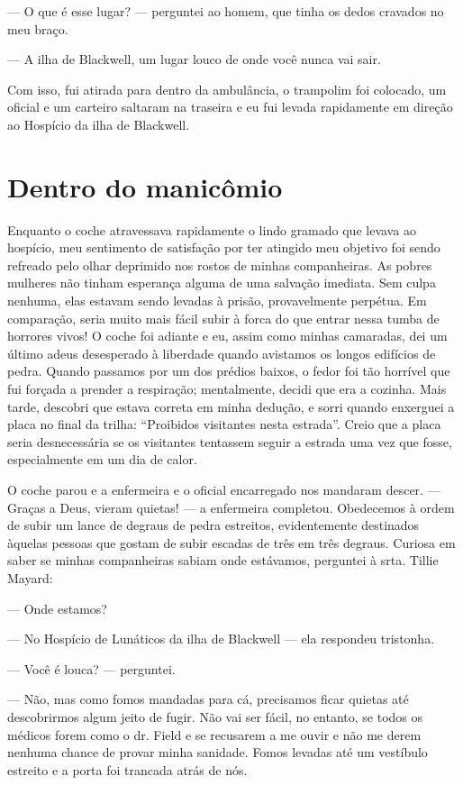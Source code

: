 --- O que é esse lugar? --- perguntei ao homem, que tinha os dedos
cravados no meu braço.

--- A ilha de Blackwell, um lugar louco de onde você nunca vai sair.

Com isso, fui atirada para dentro da ambulância, o trampolim foi
colocado, um oficial e um carteiro saltaram na traseira e eu fui levada
rapidamente em direção ao Hospício da ilha de Blackwell.

\chapter{Dentro do
manicômio}\label{capuxedtulo-viii-dentro-do-manicuxf4mio}

Enquanto o coche atravessava rapidamente o lindo gramado que levava ao
hospício, meu sentimento de satisfação por ter atingido meu objetivo foi
sendo refreado pelo olhar deprimido nos rostos de minhas companheiras.
As pobres mulheres não tinham esperança alguma de uma salvação imediata.
Sem culpa nenhuma, elas estavam sendo levadas à prisão, provavelmente
perpétua. Em comparação, seria muito mais fácil subir à forca do que
entrar nessa tumba de horrores vivos! O coche foi adiante e eu, assim
como minhas camaradas, dei um último adeus desesperado à liberdade
quando avistamos os longos edifícios de pedra. Quando passamos por um
dos prédios baixos, o fedor foi tão horrível que fui forçada a prender a
respiração; mentalmente, decidi que era a cozinha. Mais tarde, descobri
que estava correta em minha dedução, e sorri quando enxerguei a placa no
final da trilha: ``Proibidos visitantes nesta estrada''. Creio que a
placa seria desnecessária se os visitantes tentassem seguir a estrada
uma vez que fosse, especialmente em um dia de calor.

O coche parou e a enfermeira e o oficial encarregado nos mandaram
descer. --- Graças a Deus, vieram quietas! --- a enfermeira completou.
Obedecemos à ordem de subir um lance de degraus de pedra estreitos,
evidentemente destinados àquelas pessoas que gostam de subir escadas de
três em três degraus. Curiosa em saber se minhas companheiras sabiam
onde estávamos, perguntei à srta. Tillie Mayard:

--- Onde estamos?

--- No Hospício de Lunáticos da ilha de Blackwell --- ela respondeu
tristonha.

--- Você é louca? --- perguntei.

--- Não, mas como fomos mandadas para cá, precisamos ficar quietas até
descobrirmos algum jeito de fugir. Não vai ser fácil, no entanto, se
todos os médicos forem como o dr. Field e se recusarem a me ouvir e não
me derem nenhuma chance de provar minha sanidade. Fomos levadas até um
vestíbulo estreito e a porta foi trancada atrás de nós.


